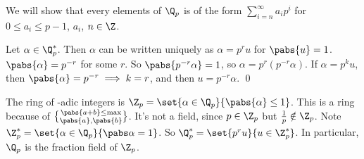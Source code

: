 We will show that every elements of $\Q_p$ is of the form $\sum_{i=n}^\infty a_i p^i$ for $0\leq a_i\leq p-1$, $a_i$, $n\in\Z$.

\thm Let $\alpha\in\Q_p^*$.  Then $\alpha$ can be written uniquely as $\alpha=p^ru$ for $\pabs{u}=1$. \\
\pf $\pabs{\alpha}=p^{-r}$ for some $r$.  So $\pabs{p^{-r}\alpha}=1$, so $\alpha=p^r(p^{-r}\alpha)$.  If $\alpha=p^ku$, then $\pabs{\alpha}=p^{-r}\implies k=r$, and then $u=p^{-r}\alpha$. \qed

 The ring of \p-adic integers is $\Z_p=\set{\alpha\in\Q_p}{\pabs{\alpha}\leq1}$.  This is a ring because of $\pabs{a+b}\leq\max\brace{\pabs{a},\pabs{b}}$.  It's not a field, since $p\in\Z_p$ but $\frac1p\notin\Z_p$.  Note $\Z_p^*=\set{\alpha\in\Q_p}{\pabs\alpha=1}$.  So $\Q_p^*=\set{p^ru}{u\in\Z_p^*}$.  In particular, $\Q_p$ is the fraction field of $\Z_p$.

